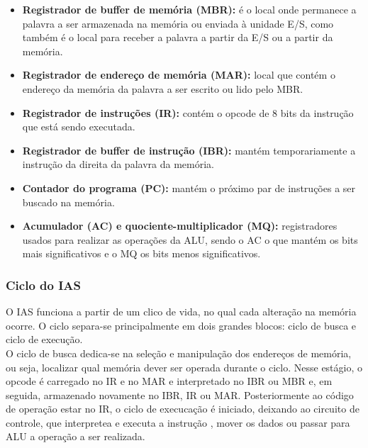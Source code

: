 \documentclass{article}
\begin{document}
\begin{itemize}
    \item \textbf{Registrador de buffer de memória (MBR):} é o local onde permanece
        a palavra a ser armazenada na memória ou enviada à unidade E/S,
        como também é o local para receber a palavra a partir da E/S ou a
        partir da memória.
    \item \textbf{Registrador de endereço de memória (MAR):} local que contém o
        endereço da memória da palavra a ser escrito ou lido pelo MBR.
    \item \textbf{Registrador de instruções (IR):} contém o opcode de 8 bits da
        instrução que está sendo executada.
    \item \textbf{Registrador de buffer de instrução (IBR):} mantém temporariamente
        a instrução da direita da palavra da memória.
    \item \textbf{Contador do programa (PC):} mantém o próximo par de instruções a
        ser buscado na memória.
    \item \textbf{Acumulador (AC) e quociente-multiplicador (MQ):} registradores
        usados para realizar as operações da ALU, sendo o AC o que mantém
        os bits mais significativos e o MQ os bits menos significativos.
\end{itemize}

\subsubsection{Ciclo do IAS}
	O IAS funciona a partir de um clico de vida, no qual cada alteração na memória ocorre. O ciclo separa-se principalmente em dois grandes blocos: ciclo de busca e ciclo de execução. \\
	O ciclo de busca dedica-se na seleção e manipulação dos endereços de memória, ou seja, localizar qual memória dever ser operada durante o ciclo. Nesse estágio, o opcode é carregado no IR e no MAR e interpretado no IBR ou MBR e, em seguida, armazenado novamente no IBR, IR ou MAR.
	Posteriormente ao código de operação estar no IR, o ciclo de execucação é iniciado, deixando ao circuito de controle, que interpretea e executa a instrução , mover os dados ou passar para ALU a operação a ser realizada.
\end{document}
